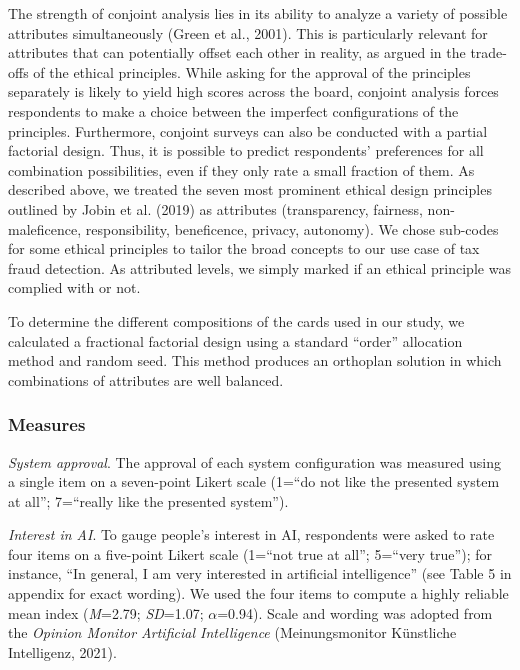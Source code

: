 \documentclass{article}
\begin{document}
The strength of conjoint analysis lies in its ability to analyze a
variety of possible attributes simultaneously (Green et al., 2001). This
is particularly relevant for attributes that can potentially offset each
other in reality, as argued in the trade-offs of the ethical principles.
While asking for the approval of the principles separately is likely to
yield high scores across the board, conjoint analysis forces respondents
to make a choice between the imperfect configurations of the principles.
Furthermore, conjoint surveys can also be conducted with a partial
factorial design. Thus, it is possible to predict respondents'
preferences for all combination possibilities, even if they only rate a
small fraction of them. As described above, we treated the seven most
prominent ethical design principles outlined by Jobin et al. (2019) as
attributes (transparency, fairness, non-maleficence, responsibility,
beneficence, privacy, autonomy). We chose sub-codes for some ethical
principles to tailor the broad concepts to our use case of tax fraud
detection. As attributed levels, we simply marked if an ethical
principle was complied with or not.

To determine the different compositions of the cards used in our study,
we calculated a fractional factorial design using a standard ``order''
allocation method and random seed. This method produces an orthoplan
solution in which combinations of attributes are well balanced.

\hypertarget{measures}{%
\subsubsection{Measures}\label{measures}}

\emph{System approval}. The approval of each system configuration was
measured using a single item on a seven-point Likert scale (1=``do not
like the presented system at all''; 7=``really like the presented
system'').

\emph{Interest in AI}. To gauge people's interest in AI, respondents
were asked to rate four items on a five-point Likert scale (1=``not true
at all''; 5=``very true''); for instance, ``In general, I am very
interested in artificial intelligence'' (see Table 5 in appendix for
exact wording). We used the four items to compute a highly reliable mean
index (\emph{M}=2.79; \emph{SD}=1.07; \(\alpha\)=0.94). Scale and
wording was adopted from the \emph{Opinion Monitor Artificial
Intelligence} (Meinungsmonitor Künstliche Intelligenz, 2021).
\end{document}
